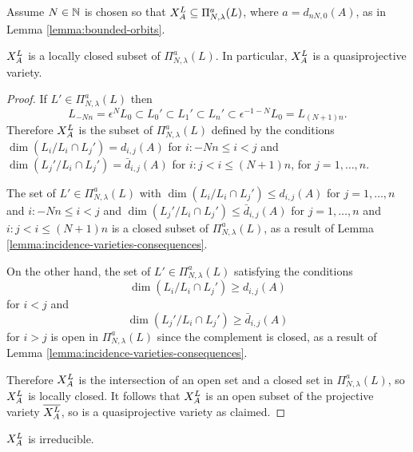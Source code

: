 \documentclass[a4paper, 11pt, twoside]{report}
\begin{document}
Assume $N\in\naturals$ is chosen so that $\xprod[L]{A}\subset\Pi_{N,\lambda}^a(L)$, where $a=d_{nN,0}{(A)}$, as in Lemma \ref{lemma:bounded-orbits}.

\begin{lemma}\label{lemma:orbits-are-quasiprojective}
$\xprod[L]{A}$ is a locally closed subset of $\Pi_{N,\lambda}^a(L)$. In particular, $\xprod[L]{A}$ is a quasiprojective variety.
\end{lemma}

\begin{proof}
If $L'\in\Pi_{N,\lambda}^a(L)$ then
\begin{equation*}
L_{-Nn}=\epsilon^N L_0\subset L_0'\subset L_1'\subset L_n'\subset \epsilon^{-1-N}L_0 = L_{(N+1)n}.
\end{equation*}
Therefore $\xprod[L]{A}$ is the subset of $\Pi_{N,\lambda}^a(L)$ defined by the conditions $\dim(L_i/{L_i\cap L_j'})=d_{i,j}{(A)}$ for $i:-Nn\le i<j$ and $\dim(L_j'/{L_i\cap L_j'})=\bar{d}_{i,j}{(A)}$ for $i:j<i\le(N+1)n$, for $j=1,\ldots,n$.

The set of $L'\in\Pi_{N,\lambda}^a(L)$ with $\dim(L_i/{L_i\cap L_j'})\le d_{i,j}{(A)}$ for $j=1,\ldots,n$ and $i:-Nn\le i<j$ and $\dim(L_j'/{L_i\cap L_j'})\le\bar{d}_{i,j}{(A)}$ for $j=1,\ldots,n$ and $i:j<i\le(N+1)n$ is a closed subset of $\Pi_{N,\lambda}^a(L)$, as a result of Lemma \ref{lemma:incidence-varieties-consequences}.

On the other hand, the set of $L'\in\Pi_{N,\lambda}^a(L)$ satisfying the conditions
\begin{equation*}
\dim(L_i/{L_i\cap L_j'})\geq d_{i,j}{(A)}
\end{equation*}
for $i<j$ and
\begin{equation*}
\dim(L_j'/{L_i\cap L_j'})\geq\bar{d}_{i,j}{(A)}
\end{equation*}
for $i>j$ is open in $\Pi_{N,\lambda}^a(L)$ since the complement is closed, as a result of Lemma \ref{lemma:incidence-varieties-consequences}.

Therefore $\xprod[L]{A}$ is the intersection of an open set and a closed set in $\Pi_{N,\lambda}^a(L)$, so $\xprod[L]{A}$ is locally closed. It follows that $\xprod[L]{A}$ is an open subset of the projective variety $\overline{\xprod[L]{A}}$, so is a quasiprojective variety as claimed.
\end{proof}

\begin{lemma}\label{lemma:orbits-are-irreducible}
$\xprod[L]{A}$ is irreducible.
\end{lemma}
\end{document}

